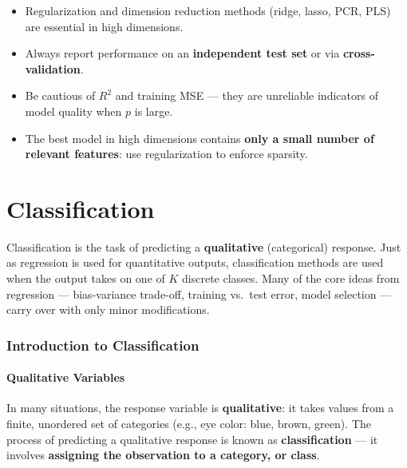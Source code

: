 \documentclass[11pt,a4paper]{article}
\theoremstyle{definition}
\theoremstyle{plain}
\theoremstyle{remark}
\begin{document}
\begin{tcolorbox}[colback=green!5!white,colframe=green!75!black,title=\textbf{High-Dimensional Takeaways}]
\begin{itemize}
    \item Regularization and dimension reduction methods (ridge, lasso, PCR, PLS) are essential in high dimensions.
    \item Always report performance on an \textbf{independent test set} or via \textbf{cross-validation}.
    \item Be cautious of $R^2$ and training MSE — they are unreliable indicators of model quality when $p$ is large.
    \item The best model in high dimensions contains \textbf{only a small number of relevant features}: use regularization to enforce sparsity.
\end{itemize}
\end{tcolorbox}

\part{Classification}

Classification is the task of predicting a \textbf{qualitative} (categorical) response. Just as regression is used for quantitative outputs, classification methods are used when the output takes on one of $K$ discrete classes. Many of the core ideas from regression — bias-variance trade-off, training vs.\ test error, model selection — carry over with only minor modifications.

\section{Introduction to Classification}

\subsection{Qualitative Variables}

In many situations, the response variable is \textbf{qualitative}: it takes values from a finite, unordered set of categories (e.g., eye color: blue, brown, green). The process of predicting a qualitative response is known as \textbf{classification} — it involves \textbf{assigning the observation to a category, or class}.
\end{document}
